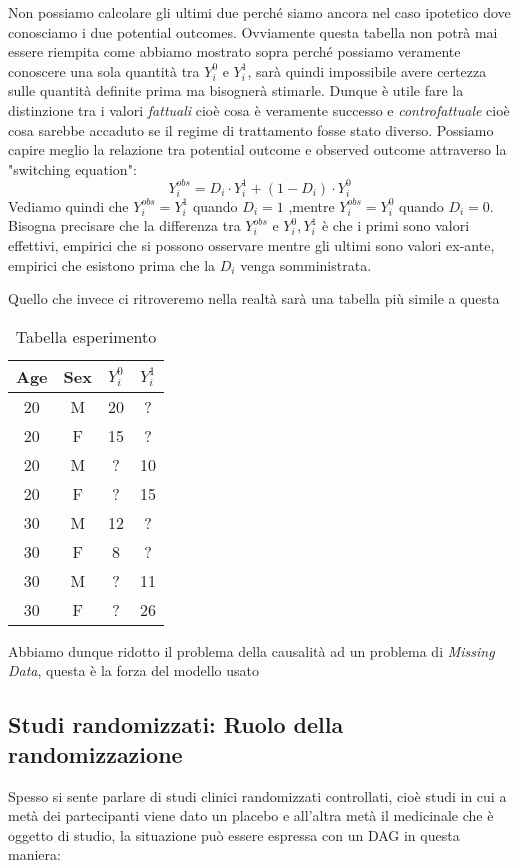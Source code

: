 \documentclass{article}
\begin{document}
Non possiamo calcolare gli ultimi due perché siamo ancora nel caso ipotetico dove conosciamo i due potential outcomes.
Ovviamente questa tabella non potrà mai essere riempita come abbiamo mostrato sopra perché possiamo veramente conoscere una sola quantità tra $Y^0_{i}$ e $Y^1_{i}$, sarà quindi impossibile avere certezza sulle quantità definite prima ma bisognerà stimarle. 
Dunque è utile fare la distinzione tra i valori \textit{fattuali} cioè cosa è veramente successo e \textit{controfattuale} cioè cosa sarebbe accaduto se il regime di trattamento fosse stato diverso.
Possiamo capire meglio la relazione tra potential outcome e observed outcome attraverso la  "switching equation": 
\begin{equation}
Y_i^{obs} = D_i \cdot Y^1_i + (1-D_i) \cdot Y^0_i
\label{eq:switching}
\end{equation}
Vediamo quindi che $Y_i^{obs} = Y^1_i$ quando $D_i =1$ ,mentre $Y_i^{obs} = Y^0_i$ quando $D_i = 0$. 
Bisogna precisare che la differenza tra $Y_i^{obs}$ e $Y^0_i,Y^1_i$ è che i primi sono valori effettivi, empirici che si possono osservare mentre gli ultimi sono valori ex-ante, empirici che esistono prima che la $D_i$ venga somministrata.

Quello che invece ci ritroveremo nella realtà sarà una tabella più simile a questa 
\begin{table}[H]
\centering
\begin{tabular}{|c|c|c|c|}
\hline
Age & Sex & $Y^{0}_i$ & $Y^{1}_i$ \\ \hline
20 & M & 20 & ?  \\ \hline
20 & F & 15 & ? \\ \hline
20 & M & ? & 10 \\ \hline
20 & F & ? & 15  \\ \hline
30 & M & 12 & ? \\ \hline
30 & F & 8 & ? \\ \hline
30 & M & ? & 11   \\ \hline
30 & F & ? & 26 \\ \hline
\end{tabular}
\caption{Tabella esperimento }
\end{table}
Abbiamo dunque ridotto il problema della causalità ad un problema di \textit{Missing Data}, questa è la forza del modello usato

\subsection{Studi randomizzati: Ruolo della randomizzazione}
Spesso si sente parlare di studi clinici randomizzati controllati, cioè studi in cui a metà dei partecipanti viene dato un placebo e all'altra metà il medicinale che è oggetto di studio, la situazione può essere espressa con un DAG in questa maniera: 
\end{document}
